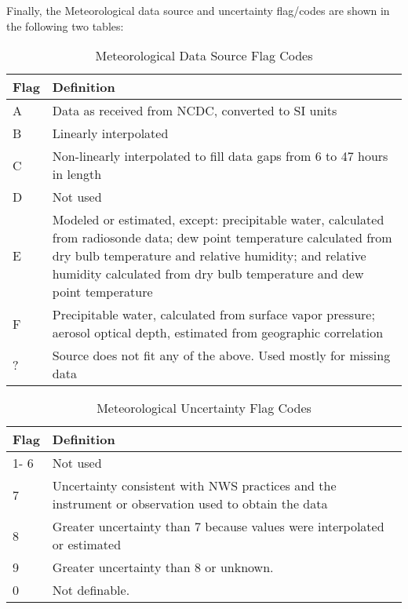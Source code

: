 Finally, the Meteorological data source and uncertainty flag/codes are shown in the following two tables:

\begin{longtable}[c]{p{1.5in}p{4.5in}}
\caption{Meteorological Data Source Flag Codes \protect \label{table:meteorological-data-source-flag-codes}}\\
\toprule 
Flag & Definition \tabularnewline \midrule
\endhead
A & Data as received from NCDC, converted to SI units \tabularnewline
B & Linearly interpolated \tabularnewline
C & Non-linearly interpolated to fill data gaps from 6 to 47 hours in length \tabularnewline
D & Not used \tabularnewline
E & Modeled or estimated, except: precipitable water, calculated from radiosonde data; dew point temperature calculated from dry bulb temperature and relative humidity; and relative humidity calculated from dry bulb temperature and dew point temperature \tabularnewline
F & Precipitable water, calculated from surface vapor pressure; aerosol optical depth, estimated from geographic correlation \tabularnewline
? & Source does not fit any of the above. Used mostly for missing data \tabularnewline
\bottomrule
\end{longtable}

\begin{longtable}[c]{p{1.5in}p{4.5in}}
\caption{Meteorological Uncertainty Flag Codes \protect \label{table:meteorological-uncertainty-flag-codes}}\\
\toprule 
Flag & Definition \tabularnewline \midrule
\endhead
1- 6 & Not used \tabularnewline
7 & Uncertainty consistent with NWS practices and the instrument or observation used to obtain the data \tabularnewline
8 & Greater uncertainty than 7 because values were interpolated or estimated \tabularnewline
9 & Greater uncertainty than 8 or unknown. \tabularnewline
0 & Not definable. \tabularnewline
\bottomrule
\end{longtable}
